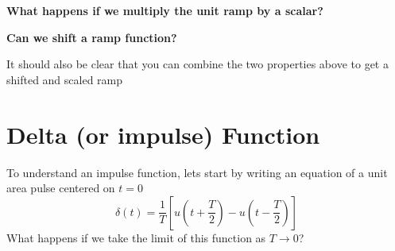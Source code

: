 \documentclass{handout}
\begin{document}
\textbf{What happens if we multiply the unit ramp by a scalar?}


\textbf{Can we shift a ramp function?}


It should also be clear that you can combine the two properties above to get a shifted and scaled ramp

\newpage
\clearpage
\pagebreak

\section{Delta (or impulse) Function}
To understand an impulse function, lets start by writing an equation of a unit area pulse centered on $t=0$
\begin{equation}
\delta (t) = \frac{1}{T}\left[u(t+\frac{T}{2}) -u(t-\frac{T}{2})  \right]
\end{equation}
What happens if we take the limit of this function as $T\rightarrow 0$?
\end{document}
